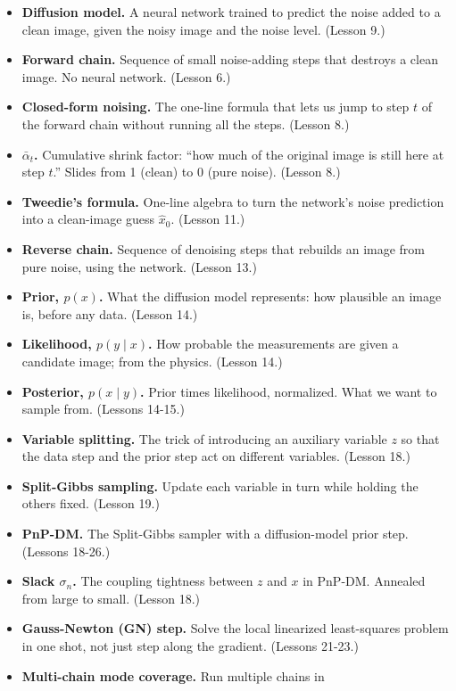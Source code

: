 \documentclass[11pt]{article}
\begin{document}
\begin{itemize}[leftmargin=2em]
\item \textbf{Diffusion model.} A neural network trained to predict
  the noise added to a clean image, given the noisy image and the
  noise level. (Lesson 9.)
\item \textbf{Forward chain.} Sequence of small noise-adding steps that
  destroys a clean image. No neural network. (Lesson 6.)
\item \textbf{Closed-form noising.} The one-line formula that lets us
  jump to step $t$ of the forward chain without running all the steps.
  (Lesson 8.)
\item \textbf{$\bar\alpha_t$.} Cumulative shrink factor: ``how much of
  the original image is still here at step $t$.'' Slides from 1
  (clean) to 0 (pure noise). (Lesson 8.)
\item \textbf{Tweedie's formula.} One-line algebra to turn the
  network's noise prediction into a clean-image guess $\hat x_0$.
  (Lesson 11.)
\item \textbf{Reverse chain.} Sequence of denoising steps that rebuilds
  an image from pure noise, using the network. (Lesson 13.)
\item \textbf{Prior, $p(x)$.} What the diffusion model represents: how
  plausible an image is, before any data. (Lesson 14.)
\item \textbf{Likelihood, $p(y \mid x)$.} How probable the
  measurements are given a candidate image; from the physics. (Lesson 14.)
\item \textbf{Posterior, $p(x \mid y)$.} Prior times likelihood,
  normalized. What we want to sample from. (Lessons 14-15.)
\item \textbf{Variable splitting.} The trick of introducing an
  auxiliary variable $z$ so that the data step and the prior step act
  on different variables. (Lesson 18.)
\item \textbf{Split-Gibbs sampling.} Update each variable in turn
  while holding the others fixed. (Lesson 19.)
\item \textbf{PnP-DM.} The Split-Gibbs sampler with a diffusion-model
  prior step. (Lessons 18-26.)
\item \textbf{Slack $\sigma_n$.} The coupling tightness between $z$
  and $x$ in PnP-DM. Annealed from large to small. (Lesson 18.)
\item \textbf{Gauss-Newton (GN) step.} Solve the local linearized
  least-squares problem in one shot, not just step along the
  gradient. (Lessons 21-23.)
\item \textbf{Multi-chain mode coverage.} Run multiple chains in

\end{itemize}
\end{document}
